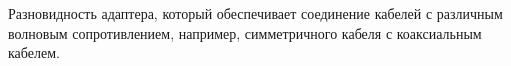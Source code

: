 Разновидность адаптера, который обеспечивает соединение кабелей с
различным волновым сопротивлением, например, симметричного кабеля с 
коаксиальным кабелем.